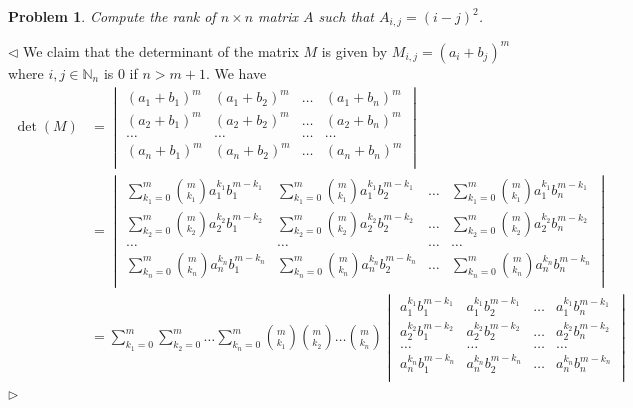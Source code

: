 \documentclass[12pt]{article}
\newtheorem{problem}{Problem}[subsection]
\newenvironment{solution}{\par $\triangleleft$}{$\triangleright$}
\begin{document}
\begin{problem} Compute the rank of $n\times n$ matrix $A$ such that $A_{i,j}=(i-j)^2$.
\end{problem}
\begin{solution} We claim that the determinant of the matrix $M$ is given by  $M_{i,j}=(a_i+b_j)^m$ where $i,j\in\mathbb{N}_n$ is $0$ if $n>m+1$. We have
$$
\begin{aligned}
\det(M)
&=\begin{vmatrix}
(a_1+b_1)^m & (a_1+b_2)^m & \ldots      & (a_1+b_n)^m\\
(a_2+b_1)^m & (a_2+b_2)^m & \ldots      & (a_2+b_n)^m\\
\ldots      & \ldots      & \ldots      & \ldots     \\
(a_n+b_1)^m & (a_n+b_2)^m & \ldots      & (a_n+b_n)^m\\
\end{vmatrix}\\
&=\begin{vmatrix}
\sum\limits_{k_1=0}^m\binom{m}{k_1} a_1^{k_1}b_1^{m-k_1} & \sum\limits_{k_1=0}^m\binom{m}{k_1} a_1^{k_1}b_2^{m-k_1} & \ldots & \sum\limits_{k_1=0}^m\binom{m}{k_1} a_1^{k_1}b_n^{m-k_1}\\
\sum\limits_{k_2=0}^m\binom{m}{k_2} a_2^{k_2}b_1^{m-k_2} & \sum\limits_{k_2=0}^m\binom{m}{k_2} a_2^{k_2}b_2^{m-k_2} & \ldots & \sum\limits_{k_2=0}^m\binom{m}{k_2} a_2^{k_2}b_n^{m-k_2}\\
\ldots & \ldots & \ldots & \ldots\\
\sum\limits_{k_n=0}^m\binom{m}{k_n} a_n^{k_n}b_1^{m-k_n} & \sum\limits_{k_n=0}^m\binom{m}{k_n} a_n^{k_n}b_2^{m-k_n} & \ldots & \sum\limits_{k_n=0}^m\binom{m}{k_n} a_n^{k_n}b_n^{m-k_n}\\
\end{vmatrix}\\
&=\sum\limits_{k_1=0}^m\sum\limits_{k_2=0}^m\ldots\sum\limits_{k_n=0}^m\binom{m}{k_1}\binom{m}{k_2}\ldots\binom{m}{k_n}
\begin{vmatrix}
a_1^{k_1} b_1^{m-k_1} & a_1^{k_1} b_2^{m-k_1} & \ldots & a_1^{k_1} b_n^{m-k_1} \\
a_2^{k_2} b_1^{m-k_2} & a_2^{k_2} b_2^{m-k_2} & \ldots & a_2^{k_2} b_n^{m-k_2} \\
\ldots                & \ldots                & \ldots & \ldots                \\
a_n^{k_n} b_1^{m-k_n} & a_n^{k_n} b_2^{m-k_n} & \ldots & a_n^{k_n} b_n^{m-k_n} \\
\end{vmatrix}\\

\end{aligned}$$
\end{solution}
\end{document}
